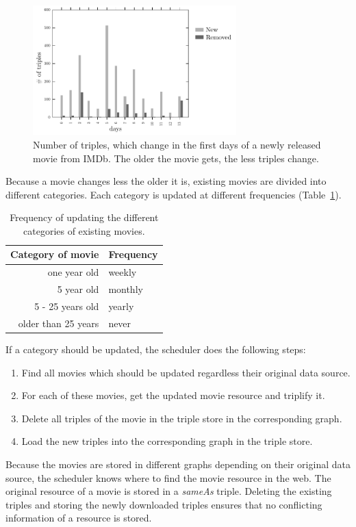 \begin{figure}[h!]
  \begin{center}
  \includegraphics[width=0.7\textwidth]{images/updating_2.pdf}
  \end{center}
  \caption{Number of triples, which change in the first days of a newly released movie from IMDb. The older the movie gets, the less triples change.}
  \label{fig_new_movie}
\end{figure}

Because a movie changes less the older it is, existing movies are divided into different categories.
Each category is updated at different frequencies (Table~\ref{tab_updating_existing}).
\begin{table}[ht]
	\begin{center}
	\begin{tabular}{rl}
		\textbf{Category of movie} & \textbf{Frequency} \\ \hline
		one year old & weekly \\
		5 year old & monthly \\
		5 - 25 years old & yearly \\
		older than 25 years & never \\
	\end{tabular}
	\end{center}
	\caption{Frequency of updating the different categories of existing movies.}
	\label{tab_updating_existing}
\end{table}
If a category should be updated, the scheduler does the following steps:
\begin{enumerate}
	\item Find all movies which should be updated regardless their original data source.
	\item For each of these movies, get the updated movie resource and triplify it.
	\item Delete all triples of the movie in the triple store in the corresponding graph.
	\item Load the new triples into the corresponding graph in the triple store.
\end{enumerate}
Because the movies are stored in different graphs depending on their original data source, the scheduler knows where to find the movie resource in the web.
The original resource of a movie is stored in a \emph{sameAs} triple.
Deleting the existing triples and storing the newly downloaded triples ensures that no conflicting information of a resource is stored.
